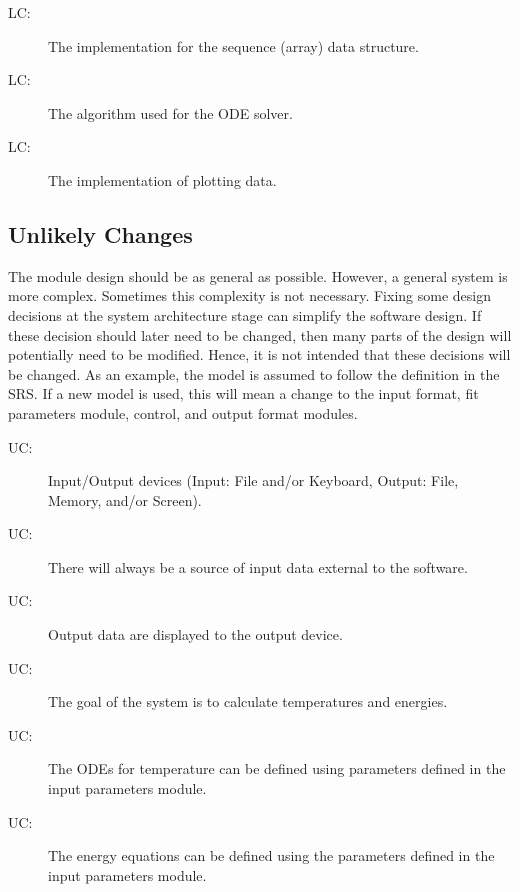\documentclass[12pt]{article}
\newcounter{lcnum}
\newcommand{\lcthelcnum}{LC\thelcnum}
\newcounter{ucnum}
\newcommand{\uctheucnum}{UC\theucnum}
\begin{document}
\begin{description}
\item[\lcthelcnum\label{LCarray}:]The implementation for the sequence (array) data structure.
\end{description}
\begin{description}
\item[\lcthelcnum\label{LCode}:]The algorithm used for the ODE solver.
\end{description}
\begin{description}
\item[\lcthelcnum\label{LCplot}:]The implementation of plotting data.
\end{description}
\subsection{Unlikely Changes}
\label{Sec:UnliChan}
The module design should be as general as possible. However, a general system is more complex. Sometimes this complexity is not necessary. Fixing some design decisions at the system architecture stage can simplify the software design. If these decision should later need to be changed, then many parts of the design will potentially need to be modified. Hence, it is not intended that these decisions will be changed.  As an example, the model is assumed to follow the definition in the SRS.  If a new model is used, this will mean a change to the input format, fit parameters module, control, and output format modules.
\begin{description}
\item[\uctheucnum\label{UCIO}:]Input/Output devices (Input: File and/or Keyboard, Output: File, Memory, and/or Screen).
\end{description}
\begin{description}
\item[\uctheucnum\label{UCinputsource}:]There will always be a source of input data external to the software.
\end{description}
\begin{description}
\item[\uctheucnum\label{UCoutput}:]Output data are displayed to the output device.
\end{description}
\begin{description}
\item[\uctheucnum\label{UCgoal}:]The goal of the system is to calculate temperatures and energies.
\end{description}
\begin{description}
\item[\uctheucnum\label{UCodes}:]The ODEs for temperature can be defined using parameters defined in the input parameters module.
\end{description}
\begin{description}
\item[\uctheucnum\label{UCenergy}:]The energy equations can be defined using the parameters defined in the input parameters module.
\end{description}
\end{document}
